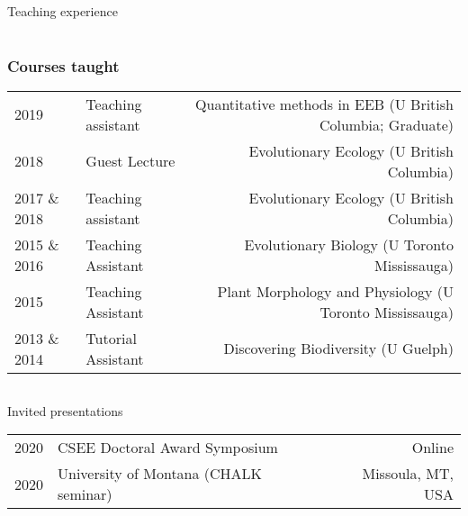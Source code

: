 \documentclass[11pt]{article}
\begin{document}
\begin{rSection}{Teaching experience}
\begin{tabular}{llr}
\end{tabular}

\subsubsection*{Courses taught}
\indent
\begin{tabular}{llr}

2019 & Teaching assistant & Quantitative methods in EEB (U British Columbia; Graduate)\\  %
2018 & Guest Lecture & Evolutionary Ecology (U British Columbia)\\ %
2017 \& 2018 & Teaching assistant & Evolutionary Ecology (U British Columbia)\\ %
2015 \& 2016 & Teaching Assistant & Evolutionary Biology (U Toronto Mississauga)\\ %
2015 & Teaching Assistant & Plant Morphology and Physiology (U Toronto Mississauga)\\ %
2013 \& 2014 & Tutorial Assistant & Discovering Biodiversity (U Guelph) %
\end{tabular}

\end{rSection}

\begin{tabular}{llr}


\end{tabular}

\vspace{0.5em}


\noindent
\begin{rSection}{Invited presentations} %
\begin{tabular}{llr}

2020 & CSEE Doctoral Award Symposium & Online \\ 
2020 & University of Montana (CHALK seminar) & Missoula, MT, USA\\
\end{tabular}

\end{rSection}
\vspace{1em}
\end{document}
